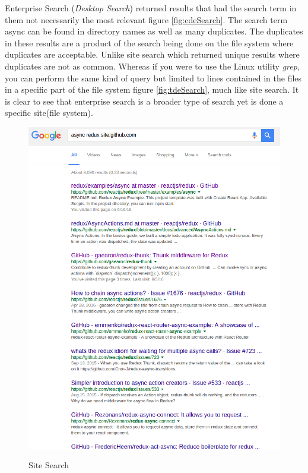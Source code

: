 \documentclass[11pt]{article}
\begin{document}
Enterprise Search (\emph{Desktop Search}) returned results that had the search term in them not necessarily the most relevant figure \hyperref[fig:cdeSearch]{\ref{fig:cdeSearch}}. The search term async can be found in directory names as well as many duplicates. The duplicates in these results are a product of the search being done on the file system where duplicates are acceptable. Unlike site search which returned unique results where duplicates are not as common. Whereas if you were to use the Linux utility \emph{grep}, you can perform the same kind of query but limited to lines contained in the files in a specific part of the file system figure \hyperref[fig:tdeSearch]{\ref{fig:tdeSearch}}, much like site search. It is clear to see that enterprise search is a broader type of search yet is done a specific site(file system).
\begin{figure}[h]
	\centering
	{\includegraphics[scale=0.5]{googleSiteSearch.png}}
	\caption{Site Search}
	\label{fig:ssearch}
\end{figure}
\end{document}
